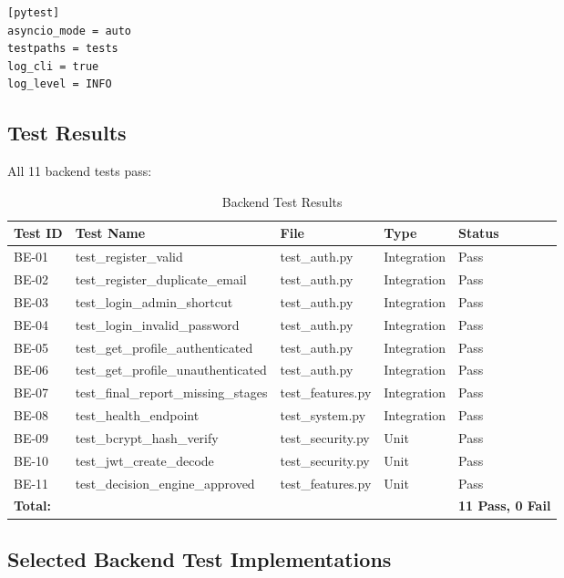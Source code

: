 \begin{lstlisting}[style=pythonstyle, caption=pytest Configuration (pytest.ini)]
[pytest]
asyncio_mode = auto
testpaths = tests
log_cli = true
log_level = INFO
\end{lstlisting}

\subsection{Test Results}

All 11 backend tests pass:

\begin{table}[H]
\centering
\caption{Backend Test Results}
\begin{tabular}{@{}lllll@{}}
\toprule
\textbf{Test ID} & \textbf{Test Name} & \textbf{File} & \textbf{Type} & \textbf{Status} \\
\midrule
BE-01 & test\_register\_valid & test\_auth.py & Integration & Pass \\
BE-02 & test\_register\_duplicate\_email & test\_auth.py & Integration & Pass \\
BE-03 & test\_login\_admin\_shortcut & test\_auth.py & Integration & Pass \\
BE-04 & test\_login\_invalid\_password & test\_auth.py & Integration & Pass \\
BE-05 & test\_get\_profile\_authenticated & test\_auth.py & Integration & Pass \\
BE-06 & test\_get\_profile\_unauthenticated & test\_auth.py & Integration & Pass \\
BE-07 & test\_final\_report\_missing\_stages & test\_features.py & Integration & Pass \\
BE-08 & test\_health\_endpoint & test\_system.py & Integration & Pass \\
BE-09 & test\_bcrypt\_hash\_verify & test\_security.py & Unit & Pass \\
BE-10 & test\_jwt\_create\_decode & test\_security.py & Unit & Pass \\
BE-11 & test\_decision\_engine\_approved & test\_features.py & Unit & Pass \\
\midrule
\multicolumn{4}{l}{\textbf{Total:}} & \textbf{11 Pass, 0 Fail} \\
\bottomrule
\end{tabular}
\end{table}

\subsection{Selected Backend Test Implementations}

